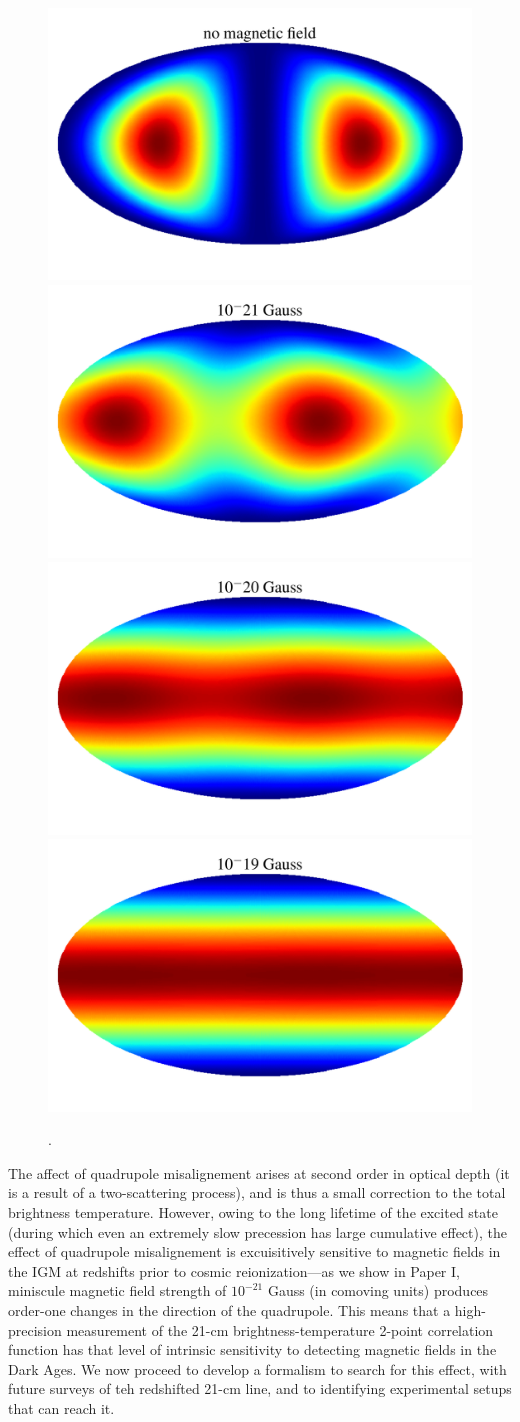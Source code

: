 \begin{figure}
\centering
\includegraphics[width=.35\textwidth,keepaspectratio=true]{hp_B_0e+00G.pdf}
\includegraphics[width=.35\textwidth,keepaspectratio=true]{hp_B_1e-18G.pdf}
\includegraphics[width=.35\textwidth,keepaspectratio=true]{hp_B_1e-17G.pdf}
\includegraphics[width=.35\textwidth,keepaspectratio=true]{hp_B_1e-16G.pdf}
\caption{.\label{fig:hp}}
\end{figure}
The affect of quadrupole misalignement arises at second order in optical depth (it is a result of a two-scattering process), and is thus a small correction to the total brightness temperature. However, owing to the long lifetime of the excited state (during which even an extremely slow precession has large cumulative effect), the effect of quadrupole misalignement is excuisitively sensitive to magnetic fields in the IGM at redshifts prior to cosmic reionization---as we show in Paper I, miniscule magnetic field strength of  $10^{-21}$ Gauss (in comoving units) produces order-one changes in the direction of the quadrupole. This means that a high-precision measurement of the 21-cm brightness-temperature 2-point correlation function has that level of intrinsic sensitivity to detecting magnetic fields in the Dark Ages. We now proceed to develop a formalism to search for this effect, with future surveys of teh redshifted 21-cm line, and to identifying experimental setups that can reach it. 